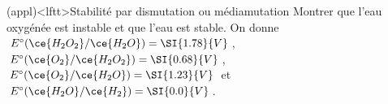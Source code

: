 \documentclass[../../main/main.tex]{subfiles}
\begin{document}
\begin{tcb*}(appl)<lftt>{Stabilité par dismutation ou médiamutation}
	Montrer que l'eau oxygénée  est instable et que l'eau est stable. On
	donne $E^\circ(\ce{H_2O_2}/\ce{H_2O}) = \SI{1.78}{V}$,
	$E^\circ(\ce{O_2}/\ce{H_2O_2}) = \SI{0.68}{V}$, $E^\circ(\ce{O_2}/\ce{H_2O}) =
		\SI{1.23}{V}$ et $E^\circ(\ce{H_2O}/\ce{H_2}) = \SI{0.0}{V}$.
	\tcblower
	\begin{isd}
		\begin{center}
		\end{center}
		\tcblower
		\begin{center}
\end{center}
\end{isd}
\end{tcb*}
\end{document}
